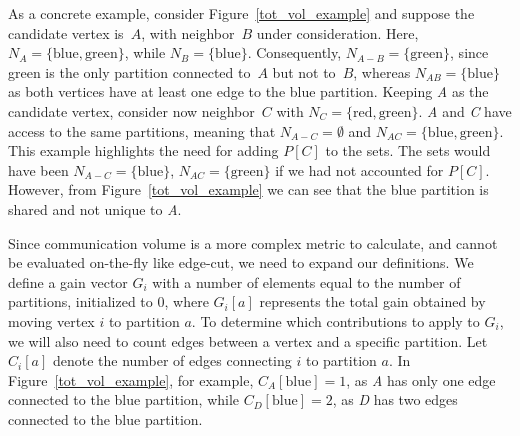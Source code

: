 As a concrete example, consider Figure~\ref{tot_vol_example} and suppose the candidate vertex is~$A$, with neighbor~$B$ under consideration. Here, $N_A = \{\mathrm{blue}, \mathrm{green}\}$, while $N_B = \{\mathrm{blue}\}$. Consequently, $N_{A-B} = \{\mathrm{green}\}$, since green is the only partition connected to~$A$ but not to~$B$, whereas $N_{AB} = \{\mathrm{blue}\}$ as both vertices have at least one edge to the blue partition. Keeping \textit{A} as the candidate vertex, consider now neighbor~$C$ with $N_C = \{\mathrm{red}, \mathrm{green}\}$. \textit{A} and \textit{C} have access to the same partitions, meaning that $N_{A-C} = \emptyset$ and $N_{AC} = \{\mathrm{blue}, \mathrm{green}\}$. This example highlights the need for adding $P[C]$ to the sets. The sets would have been $N_{A-C} = \{\mathrm{blue}\}$, $N_{AC} = \{\mathrm{green}\}$ if we had not accounted for $P[C]$. However, from Figure~\ref{tot_vol_example} we can see that the blue partition is shared and not unique to \textit{A}.

Since communication volume is a more complex metric to calculate, and cannot be evaluated on-the-fly like edge-cut, we need to expand our definitions. We define a gain vector $G_i$ with a number of elements equal to the number of partitions, initialized to 0, where $G_i[a]$ represents the total gain obtained by moving vertex $i$ to partition $a$. To determine which contributions to apply to $G_i$, we will also need to count edges between a vertex and a specific partition. Let $C_i[a]$ denote the number of edges connecting $i$ to partition $a$. In Figure~\ref{tot_vol_example}, for example, $C_A[\mathrm{blue}] = 1$, as \textit{A} has only one edge connected to the blue partition, while $C_D[\mathrm{blue}] = 2$, as \textit{D} has two edges connected to the blue partition. 

